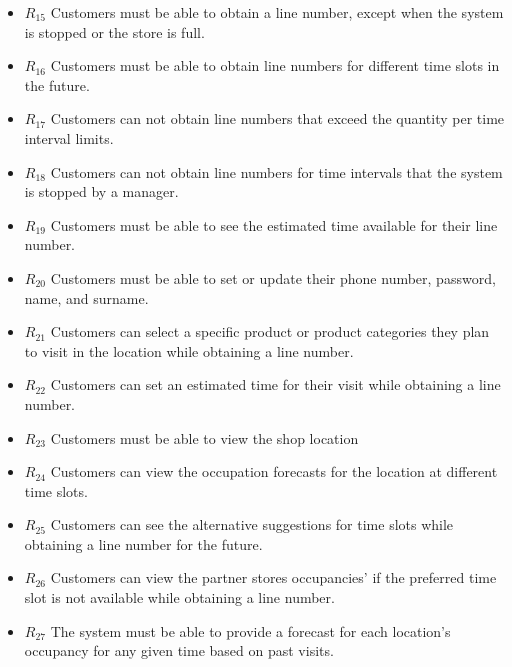 \begin{itemize}
    \item \textbf{$R_{15}$} Customers must be able to obtain a line number, except when the system is stopped or the store is full.
    \item \textbf{$R_{16}$} Customers must be able to obtain line numbers for different time slots in the future.
    \item \textbf{$R_{17}$} Customers can not obtain line numbers that exceed the quantity per time interval limits.
    \item \textbf{$R_{18}$} Customers can not obtain line numbers for time intervals that the system is stopped by a manager.
    \item \textbf{$R_{19}$} Customers must be able to see the estimated time available for their line number.
    \item \textbf{$R_{20}$} Customers must be able to set or update their phone number, password, name, and surname.
    \item \textbf{$R_{21}$} Customers can select a specific product or product categories they plan to visit in the location while obtaining a line number.
    \item \textbf{$R_{22}$} Customers can set an estimated time for their visit while obtaining a line number.
    \item \textbf{$R_{23}$} Customers must be able to view the shop location
    \item \textbf{$R_{24}$} Customers can view the occupation forecasts for the location at different time slots.
    \item \textbf{$R_{25}$} Customers can see the alternative suggestions for time slots while obtaining a line number for the future.
    \item \textbf{$R_{26}$} Customers can view the partner stores occupancies' if the preferred time slot is not available while obtaining a line number.
    \item \textbf{$R_{27}$} The system must be able to provide a forecast for each location's occupancy for any given time based on past visits.
\end{itemize}


